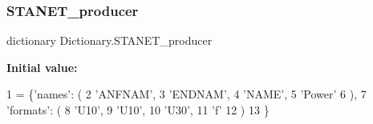\subsubsection{\texorpdfstring{S\+T\+A\+N\+E\+T\+\_\+producer}{STANET\_producer}}
{\footnotesize\ttfamily dictionary Dictionary.\+S\+T\+A\+N\+E\+T\+\_\+producer}

{\bfseries Initial value\+:}
\begin{DoxyCode}
1 =  \{\textcolor{stringliteral}{'names'}: (
2                             \textcolor{stringliteral}{'ANFNAM'},
3                             \textcolor{stringliteral}{'ENDNAM'},
4                             \textcolor{stringliteral}{'NAME'},
5                             \textcolor{stringliteral}{'Power'}
6                             ),
7                     \textcolor{stringliteral}{'formats'}: (
8                                 \textcolor{stringliteral}{'U10'},
9                                 \textcolor{stringliteral}{'U10'},
10                                 \textcolor{stringliteral}{'U30'},
11                                 \textcolor{stringliteral}{'f'}
12                                 )
13                     \}
\end{DoxyCode}
